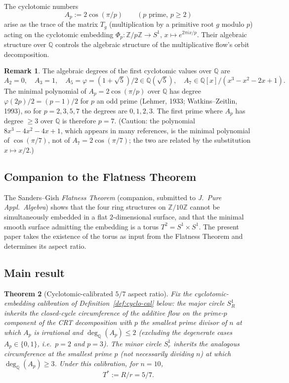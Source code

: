 \documentclass[11pt,reqno]{amsart}
\theoremstyle{plain}
\newtheorem{theorem}{Theorem}
\theoremstyle{definition}
\newtheorem{remark}[theorem]{Remark}
\newcommand{\Z}{\mathbb{Z}}
\newcommand{\Q}{\mathbb{Q}}
\newcommand{\Tstar}{T^{*}}
\begin{document}
The cyclotomic numbers
\[
A_p := 2 \cos(\pi/p) \qquad (p \text{ prime}, \, p \geq 2)
\]
arise as the trace of the matrix $T_g$ (multiplication by a primitive root $g$ modulo $p$) acting on the cyclotomic embedding $\Phi_p \colon \Z/p\Z \to S^1$, $x \mapsto e^{2\pi i x/p}$. Their algebraic structure over $\Q$ controls the algebraic structure of the multiplicative flow's orbit decomposition.

\begin{remark}
The algebraic degrees of the first cyclotomic values over $\Q$ are
\[
A_2 = 0,\quad A_3 = 1,\quad A_5 = \varphi = (1+\sqrt 5)/2 \in \Q(\sqrt 5),\quad A_7 \in \Q[x]/(x^3 - x^2 - 2x + 1).
\]
The minimal polynomial of $A_p = 2\cos(\pi/p)$ over $\Q$ has degree $\varphi(2p)/2 = (p-1)/2$ for $p$ an odd prime (Lehmer, 1933; Watkins--Zeitlin, 1993), so for $p = 2,3,5,7$ the degrees are $0, 1, 2, 3$. The first prime where $A_p$ has degree $\ge 3$ over $\Q$ is therefore $p = 7$. (Caution: the polynomial $8x^{3} - 4x^{2} - 4x + 1$, which appears in many references, is the minimal polynomial of $\cos(\pi/7)$, not of $A_7 = 2\cos(\pi/7)$; the two are related by the substitution $x \mapsto x/2$.)
\end{remark}

\subsection{Companion to the Flatness Theorem}

The Sanders--Gish \emph{Flatness Theorem} (companion, submitted to \emph{J.\ Pure Appl.\ Algebra}) shows that the four ring structures on $\Z/10\Z$ cannot be simultaneously embedded in a flat $2$-dimensional surface, and that the minimal smooth surface admitting the embedding is a torus $T^2 = S^1 \times S^1$. The present paper takes the existence of the torus as input from the Flatness Theorem and determines its aspect ratio.

\subsection{Main result}

\begin{theorem}[Cyclotomic-calibrated $5/7$ aspect ratio] \label{thm:forced57}
Fix the cyclotomic-embedding calibration of Definition~\ref{def:cyclo-cal} below: the major circle $S^{1}_{R}$ inherits the closed-cycle circumference of the additive flow on the prime-$p$ component of the CRT decomposition with $p$ the smallest prime divisor of $n$ at which $A_{p}$ is irrational and $\deg_{\Q}(A_{p}) \le 2$ (excluding the degenerate cases $A_{p} \in \{0, 1\}$, i.e.\ $p = 2$ and $p = 3$). The minor circle $S^{1}_{r}$ inherits the analogous circumference at the smallest prime $p$ (not necessarily dividing $n$) at which $\deg_{\Q}(A_{p}) \ge 3$. Under this calibration, for $n = 10$,
\[
\Tstar := R/r = 5/7.
\]
\end{theorem}
\end{document}
